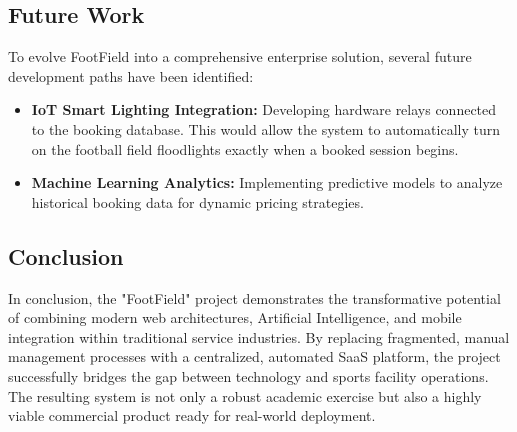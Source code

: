\subsection{Future Work}
To evolve FootField into a comprehensive enterprise solution, several future development paths have been identified:
\begin{itemize}
    \item \textbf{IoT Smart Lighting Integration:} Developing hardware relays connected to the booking database. This would allow the system to automatically turn on the football field floodlights exactly when a booked session begins.
    \item \textbf{Machine Learning Analytics:} Implementing predictive models to analyze historical booking data for dynamic pricing strategies.
\end{itemize}

\subsection{Conclusion}
In conclusion, the "FootField" project demonstrates the transformative potential of combining modern web architectures, Artificial Intelligence, and mobile integration within traditional service industries. By replacing fragmented, manual management processes with a centralized, automated SaaS platform, the project successfully bridges the gap between technology and sports facility operations. The resulting system is not only a robust academic exercise but also a highly viable commercial product ready for real-world deployment.
